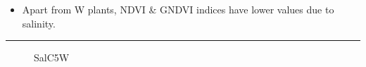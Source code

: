 \documentclass{article}
\begin{document}
{\begin{landscape}
                    \begin{itemize}
                       \item Apart from W plants, NDVI & GNDVI indices have lower values due to salinity.
                    \end{itemize}
                    \newpage
                    \vspace*{-3.8\baselineskip}
                    \hrule
                    \vspace*{3\baselineskip}
                    
                    \begin{figure}[h]
                        \centering
                        \qquad
                        \caption{SalC5W}%
                        \label{fig:example}
                    \end{figure}
                    \vspace*{2\baselineskip}
                    

\end{landscape}}
\end{document}
